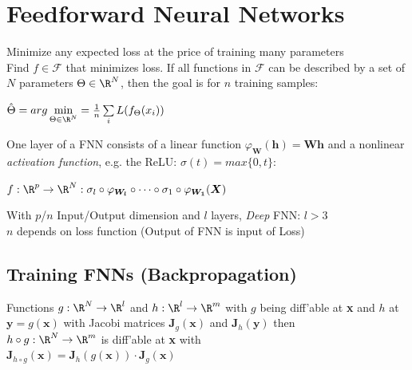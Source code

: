 \documentclass[english]{latex4ei/latex4ei_sheet}
\begin{document}
\section{Feedforward Neural Networks}
\begin{sectionbox}
Minimize any expected loss at the price of training many parameters\\
Find $f\in \mathcal{F}$ that minimizes loss. If all functions in $\mathcal{F}$ can be described by a set of $N$ parameters $\Theta\in\R^N$, then the goal is for $n$ training samples: \\
\begin{center}
    $\hat{\Theta}=arg\min\limits_{\Theta\in\R^N}=\frac{1}{n}\sum\limits_iL(f_\Theta(x_i))$
\end{center}
One layer of a FNN consists of a linear function $\varphi_{\boldsymbol{W}}(\boldsymbol{h})=\boldsymbol{Wh}$ and a nonlinear \emph{activation function}, e.g. the ReLU: $\sigma(t) = max\{0, t\}$:
\begin{center}
    $f:\R^p \rightarrow \R^N: \sigma_l\circ\varphi_{\boldsymbol{W_l}}\circ\cdots\circ\sigma_1\circ\varphi_{\boldsymbol{W_1}}(\boldsymbol{X})$
\end{center}
With $p$/$n$ Input/Output dimension and $l$ layers, \emph{Deep} FNN: $l>3$\\
$n$ depends on loss function (Output of FNN is input of Loss)

\subsection{Training FNNs (Backpropagation)}
\begin{emphbox}
        Functions $g:\R^N\rightarrow\R^l$ and $h:\R^l\rightarrow\R^m$ with $g$ being diff'able at \textbf{x} and $h$ at $\boldsymbol{y}=g(\boldsymbol{x})$ with Jacobi matrices $\boldsymbol{J}_g(\boldsymbol{x})$ and $\boldsymbol{J}_h(\boldsymbol{y})$ then\\
        $h\circ g:\R^N\rightarrow\R^m$ is diff'able at \textbf{x} with\\
        $\boldsymbol{J}_{h\circ g}(\boldsymbol{x})=\boldsymbol{J}_h(g(\boldsymbol{x}))\cdot \boldsymbol{J}_g(\boldsymbol{x})$
\end{emphbox}
\end{sectionbox}
\end{document}
